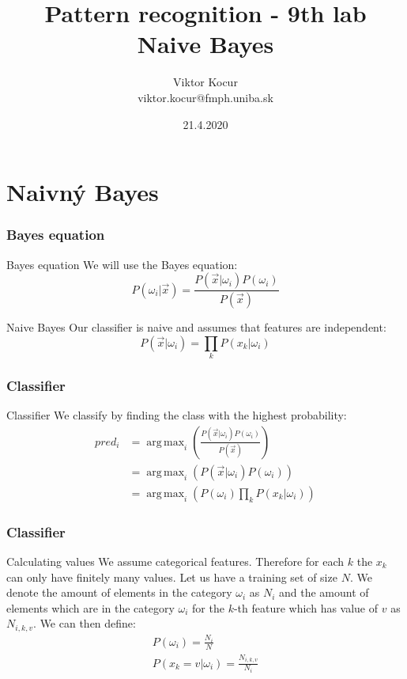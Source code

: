 \documentclass{beamer}
\title[Stromy]{Pattern recognition - 9th lab \\ Naive Bayes}
\author[Viktor Kocur]{Viktor Kocur \\{\small viktor.kocur@fmph.uniba.sk}}
\institute{DAI FMFI UK}
\date{21.4.2020}
\DeclareMathOperator*{\argmax}{arg\,max}
\begin{document}

\begin{frame}[plain]
  \titlepage  
\end{frame}

\section{Naivný Bayes}

\begin{frame}
\frametitle{Bayes equation}
\begin{block}{Bayes equation}
We will use the Bayes equation:
\begin{equation}
P(\omega_i | \vec{x}) = \frac{P(\vec{x}|\omega_i) P(\omega_i)}{P(\vec{x})}
\end{equation}
\end{block}

\begin{block}{Naive Bayes}
Our classifier is naive and assumes that features are independent:
\begin{equation}
P(\vec{x}|\omega_i) = \prod_{k} P(x_k | \omega_i)
\end{equation}
\end{block}
\end{frame}


\begin{frame}
\frametitle{Classifier}
\begin{block}{Classifier}
We classify by finding the class with the highest probability:
\begin{align}
pred_i &= \argmax_i \left( \frac{P(\vec{x}|\omega_i) P(\omega_i)}{P(\vec{x})} \right) \\
          &= \argmax_i \left(P(\vec{x}|\omega_i) P(\omega_i) \right) \\
          &= \argmax_i \left(P(\omega_i) \prod_{k} P(x_k | \omega_i) \right)
\end{align}
\end{block}
\end{frame}


\begin{frame}
\frametitle{Classifier}
\begin{block}{Calculating values}
We assume categorical features. Therefore for each $k$ the $x_k$ can only have finitely many values. Let us have a training set of size $N$. We denote the amount of elements in the category $\omega_i$ as $N_i$ and the amount of elements which are in the category $\omega_i$ for the $k$-th feature which has value of $v$ as $N_{i,k,v}$. We can then define:
\begin{gather}
P(\omega_i) = \frac{N_i}{N} \\
P(x_k = v | \omega_i) = \frac{N_{i,k,v}}{N_i} 
\end{gather}
\end{block}
\end{frame}
\end{document}
